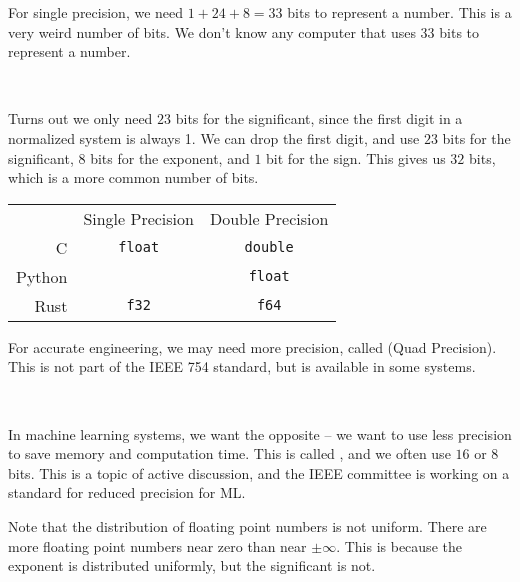 \begin{remark}
    For single precision, we need \( 1 + 24 + 8 = 33 \) bits to represent a number. This is a very weird number of bits. We don't know any computer that uses 33 bits to represent a number.

        {~~~}

    Turns out we only need \( 23 \) bits for the significant, since the first digit in a normalized system is always 1. We can drop the first digit, and use \( 23 \) bits for the significant, \( 8 \) bits for the exponent, and \( 1 \) bit for the sign. This gives us \( 32 \) bits, which is a more common number of bits.
\end{remark}

\begin{note}
    \begin{table}[H]
        \centering
        \begin{tabular}{rcc}
                   & Single Precision & Double Precision \\
            C      & \texttt{float}   & \texttt{double}  \\
            Python &                  & \texttt{float}   \\
            Rust   & \texttt{f32}     & \texttt{f64}
        \end{tabular}
    \end{table}
\end{note}

\begin{note}
    For accurate engineering, we may need more precision, called  (Quad Precision). This is not part of the IEEE 754 standard, but is available in some systems.

        {~~~}

    In machine learning systems, we want the opposite -- we want to use less precision to save memory and computation time. This is called , and we often use \( 16 \) or \( 8 \) bits. This is a topic of active discussion, and the IEEE committee is working on a standard for reduced precision for ML.
\end{note}

Note that the distribution of floating point numbers is not uniform. There are more floating point numbers near zero than near \( \pm \infty \). This is because the exponent is distributed uniformly, but the significant is not.

